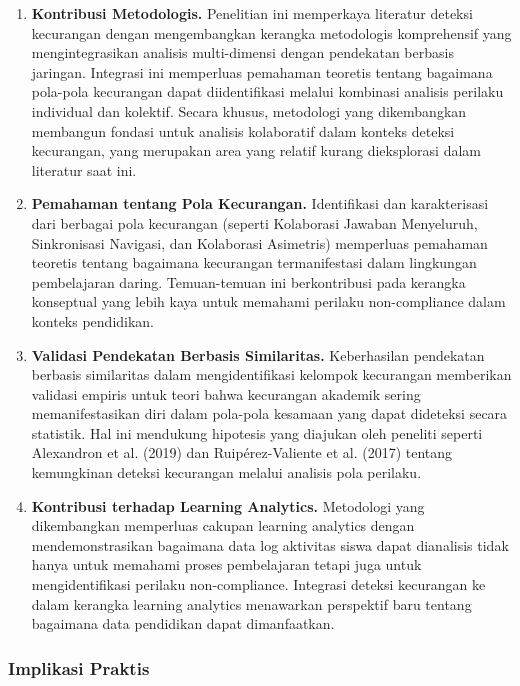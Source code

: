 \begin{enumerate}
    \item \textbf{Kontribusi Metodologis.} Penelitian ini memperkaya literatur deteksi kecurangan dengan mengembangkan kerangka metodologis komprehensif yang mengintegrasikan analisis multi-dimensi dengan pendekatan berbasis jaringan. Integrasi ini memperluas pemahaman teoretis tentang bagaimana pola-pola kecurangan dapat diidentifikasi melalui kombinasi analisis perilaku individual dan kolektif. Secara khusus, metodologi yang dikembangkan membangun fondasi untuk analisis kolaboratif dalam konteks deteksi kecurangan, yang merupakan area yang relatif kurang dieksplorasi dalam literatur saat ini.

    \item \textbf{Pemahaman tentang Pola Kecurangan.} Identifikasi dan karakterisasi dari berbagai pola kecurangan (seperti Kolaborasi Jawaban Menyeluruh, Sinkronisasi Navigasi, dan Kolaborasi Asimetris) memperluas pemahaman teoretis tentang bagaimana kecurangan termanifestasi dalam lingkungan pembelajaran daring. Temuan-temuan ini berkontribusi pada kerangka konseptual yang lebih kaya untuk memahami perilaku non-compliance dalam konteks pendidikan.

    \item \textbf{Validasi Pendekatan Berbasis Similaritas.} Keberhasilan pendekatan berbasis similaritas dalam mengidentifikasi kelompok kecurangan memberikan validasi empiris untuk teori bahwa kecurangan akademik sering memanifestasikan diri dalam pola-pola kesamaan yang dapat dideteksi secara statistik. Hal ini mendukung hipotesis yang diajukan oleh peneliti seperti Alexandron et al. (2019) dan Ruipérez-Valiente et al. (2017) tentang kemungkinan deteksi kecurangan melalui analisis pola perilaku.

    \item \textbf{Kontribusi terhadap Learning Analytics.} Metodologi yang dikembangkan memperluas cakupan learning analytics dengan mendemonstrasikan bagaimana data log aktivitas siswa dapat dianalisis tidak hanya untuk memahami proses pembelajaran tetapi juga untuk mengidentifikasi perilaku non-compliance. Integrasi deteksi kecurangan ke dalam kerangka learning analytics menawarkan perspektif baru tentang bagaimana data pendidikan dapat dimanfaatkan.
\end{enumerate}

\subsubsection{Implikasi Praktis}

